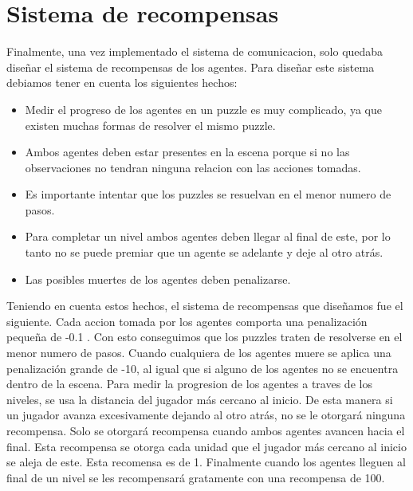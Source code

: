 \section{Sistema de recompensas}

Finalmente, una vez implementado el sistema de comunicacion, solo quedaba diseñar el sistema de recompensas de los agentes. Para diseñar este sistema debiamos tener en cuenta los siguientes hechos:

\begin{itemize}
    \item Medir el progreso de los agentes en un puzzle es muy complicado, ya que existen muchas formas de resolver el mismo puzzle.
    \item Ambos agentes deben estar presentes en la escena porque si no las observaciones no tendran ninguna relacion con las acciones tomadas.
    \item Es importante intentar que los puzzles se resuelvan en el menor numero de pasos.
    \item Para completar un nivel ambos agentes deben llegar al final de este, por lo tanto no se puede premiar que un agente se adelante y deje al otro atrás.
    \item Las posibles muertes de los agentes deben penalizarse.
\end{itemize}

Teniendo en cuenta estos hechos, el sistema de recompensas que diseñamos fue el siguiente. Cada accion tomada por los agentes comporta una penalización pequeña de -0.1 . Con esto conseguimos que los puzzles traten de resolverse en el menor numero de pasos. Cuando cualquiera de los agentes muere se aplica una penalización grande de -10, al igual que si alguno de los agentes no se encuentra dentro de la escena. Para medir la progresion de los agentes a traves de los niveles, se usa la distancia del jugador más cercano al inicio. De esta manera si un jugador avanza excesivamente dejando al otro atrás, no se le otorgará ninguna recompensa. Solo se otorgará recompensa cuando ambos agentes avancen hacia el final.  Esta recompensa se otorga cada unidad que el jugador más cercano al inicio se aleja de este. Esta recomensa es de 1. Finalmente cuando los agentes lleguen al final de un nivel se les recompensará gratamente con una recompensa de 100.